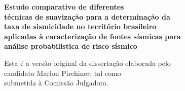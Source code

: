 \documentclass[12pt,twoside,a4paper]{book}
\begin{document}
%
%
%
\newpage
\thispagestyle{empty}
    \begin{center}
        \vspace*{2.3 cm}
	    \textbf{\Large{Estudo comparativo de diferentes \\
			técnicas de suavização para a determinação da \\ 
		    taxa de sismicidade no território brasileiro \\
		    aplicadas à caracterização de fontes sísmicas para \\
		    análise probabilistica de risco sísmico}}\\
        \vspace*{2 cm}
    \end{center}

    \vskip 2cm

    \begin{flushright}
	Esta é a versão original da dissertação elaborada pelo\\
	candidato Marlon Pirchiner, tal como \\
	submetida à Comissão Julgadora.
    \end{flushright}

\pagebreak
\end{document}

